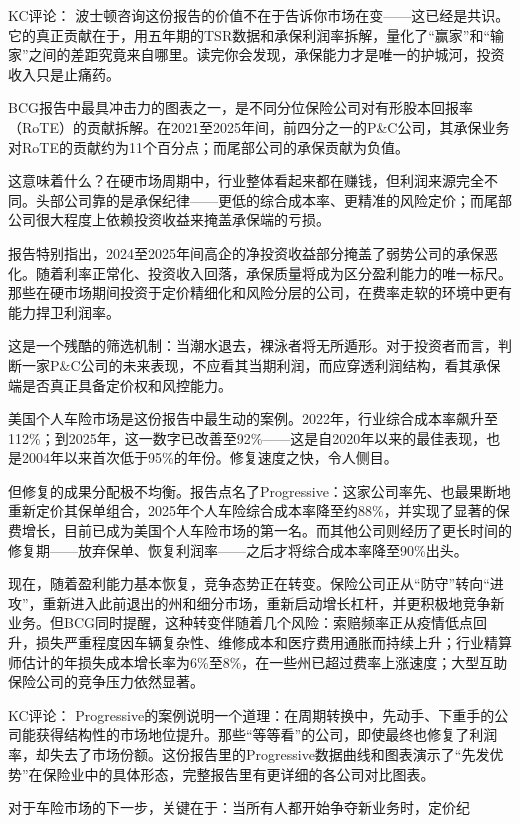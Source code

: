 \documentclass[11pt]{ctexart}
\begin{document}
KC评论： 波士顿咨询这份报告的价值不在于告诉你市场在变——这已经是共识。它的真正贡献在于，用五年期的TSR数据和承保利润率拆解，量化了“赢家”和“输家”之间的差距究竟来自哪里。读完你会发现，承保能力才是唯一的护城河，投资收入只是止痛药。

BCG报告中最具冲击力的图表之一，是不同分位保险公司对有形股本回报率（RoTE）的贡献拆解。在2021至2025年间，前四分之一的P\&C公司，其承保业务对RoTE的贡献约为11个百分点；而尾部公司的承保贡献为负值。

这意味着什么？在硬市场周期中，行业整体看起来都在赚钱，但利润来源完全不同。头部公司靠的是承保纪律——更低的综合成本率、更精准的风险定价；而尾部公司很大程度上依赖投资收益来掩盖承保端的亏损。

报告特别指出，2024至2025年间高企的净投资收益部分掩盖了弱势公司的承保恶化。随着利率正常化、投资收入回落，承保质量将成为区分盈利能力的唯一标尺。那些在硬市场期间投资于定价精细化和风险分层的公司，在费率走软的环境中更有能力捍卫利润率。

这是一个残酷的筛选机制：当潮水退去，裸泳者将无所遁形。对于投资者而言，判断一家P\&C公司的未来表现，不应看其当期利润，而应穿透利润结构，看其承保端是否真正具备定价权和风控能力。

美国个人车险市场是这份报告中最生动的案例。2022年，行业综合成本率飙升至112\%；到2025年，这一数字已改善至92\%——这是自2020年以来的最佳表现，也是2004年以来首次低于95\%的年份。修复速度之快，令人侧目。

但修复的成果分配极不均衡。报告点名了Progressive：这家公司率先、也最果断地重新定价其保单组合，2025年个人车险综合成本率降至约88\%，并实现了显著的保费增长，目前已成为美国个人车险市场的第一名。而其他公司则经历了更长时间的修复期——放弃保单、恢复利润率——之后才将综合成本率降至90\%出头。

现在，随着盈利能力基本恢复，竞争态势正在转变。保险公司正从“防守”转向“进攻”，重新进入此前退出的州和细分市场，重新启动增长杠杆，并更积极地竞争新业务。但BCG同时提醒，这种转变伴随着几个风险：索赔频率正从疫情低点回升，损失严重程度因车辆复杂性、维修成本和医疗费用通胀而持续上升；行业精算师估计的年损失成本增长率为6\%至8\%，在一些州已超过费率上涨速度；大型互助保险公司的竞争压力依然显著。

KC评论： Progressive的案例说明一个道理：在周期转换中，先动手、下重手的公司能获得结构性的市场地位提升。那些“等等看”的公司，即使最终也修复了利润率，却失去了市场份额。这份报告里的Progressive数据曲线和图表演示了“先发优势”在保险业中的具体形态，完整报告里有更详细的各公司对比图表。

对于车险市场的下一步，关键在于：当所有人都开始争夺新业务时，定价纪
\end{document}
